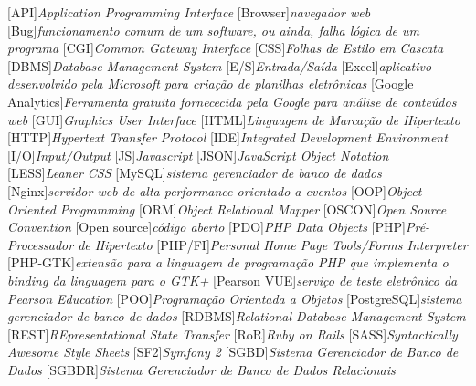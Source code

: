 
			[API]{\textit{Application Programming Interface}}
		[Browser]{\textit{navegador web}}
			[Bug]{\textit{funcionamento comum de um software, ou ainda, falha
lógica de um programa}}
			[CGI]{\textit{Common Gateway Interface }}
			[CSS]{\textit{Folhas de Estilo em Cascata}}
			[DBMS]{\textit{Database Management System}}
			[E/S]{\textit{Entrada/Saída}}
		[Excel]{\textit{aplicativo desenvolvido pela Microsoft para
criação de planilhas eletrônicas}}
	[Google Analytics]{\textit{Ferramenta gratuita fornececida pela
Google para análise de conteúdos web}}
			[GUI]{\textit{Graphics User Interface}}
			[HTML]{\textit{Linguagem de Marcação de Hipertexto}}
			[HTTP]{\textit{Hypertext Transfer Protocol}}
			[IDE]{\textit{Integrated Development Environment}}
			[I/O]{\textit{Input/Output}}
			[JS]{\textit{Javascript}}
			[JSON]{\textit{JavaScript Object Notation}}
			[LESS]{\textit{Leaner CSS}}
		[MySQL]{\textit{sistema gerenciador de banco de dados}}
		[Nginx]{\textit{servidor web de alta performance orientado a
eventos}}
			[OOP]{\textit{Object Oriented Programming}}
			[ORM]{\textit{Object Relational Mapper}}
		[OSCON]{\textit{Open Source Convention}}
	[Open source]{\textit{código aberto}}
			[PDO]{\textit{‎PHP Data Objects}}
			[PHP]{\textit{Pré-Processador de Hipertexto}}
		[PHP/FI]{\textit{Personal Home Page Tools/Forms Interpreter}}
		[PHP-GTK]{\textit{extensão para a linguagem de programação PHP
que implementa o binding da linguagem para o GTK+}}
	[Pearson VUE]{\textit{serviço de teste eletrônico da Pearson Education}}
			[POO]{\textit{Programação Orientada a Objetos}}
	[PostgreSQL]{\textit{sistema gerenciador de banco de dados}}
		[RDBMS]{\textit{Relational Database Management System}}
			[REST]{\textit{REpresentational State Transfer}}
			[RoR]{\textit{Ruby on Rails}}
			[SASS]{\textit{Syntactically Awesome Style Sheets}}
			[SF2]{\textit{Symfony 2}}
			[SGBD]{\textit{Sistema Gerenciador de Banco de Dados}}
		[SGBDR]{\textit{Sistema Gerenciador de Banco de Dados
Relacionais}}
